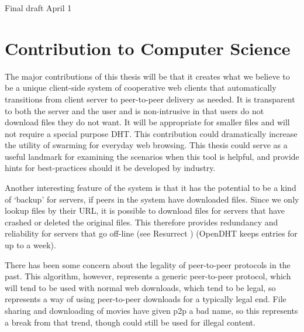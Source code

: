 Final draft April 1

\section {Contribution to Computer Science}
The major contributions of this thesis will be that it creates what we believe to be a unique client-side system of cooperative web clients that automatically transitions from client server to peer-to-peer delivery as needed.  It is transparent to both the server and the user and is non-intrusive in that users do not download files they do not want.  It will  be appropriate for smaller files and will not require a special purpose DHT.  This contribution could dramatically increase the utility of swarming for everyday web browsing.  This thesis could serve as a useful landmark for examining the scenarios when this tool is helpful, and provide hints for best-practices should it be developed by industry.

Another interesting feature of the system is that it has the potential to be a kind of `backup' for servers, if peers in the system have downloaded files.  Since we only lookup files by their URL, it is possible to download files for servers that have crashed or deleted the original files.  This therefore provides redundancy and reliability for servers that go off-line (see Resurrect \cite{resurrect}) (OpenDHT keeps entries for up to a week).  

There has been some concern about the legality of peer-to-peer protocols in the past.  This algorithm, however, represents a generic peer-to-peer protocol, which will tend to be used with normal web downloads, which tend to be legal, so represents a way of using peer-to-peer downloads for a typically legal end.  File sharing and downloading of movies have given p2p a bad name, so this represents a break from that trend, though could still be used for illegal content.

